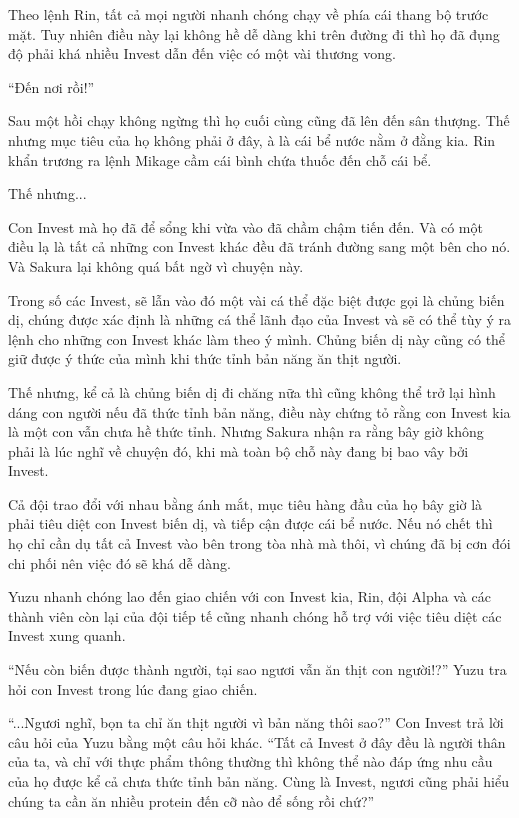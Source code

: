 {Theo lệnh Rin, tất cả mọi người nhanh chóng chạy về phía cái thang bộ
trước mặt. Tuy nhiên điều này lại không hề dễ dàng khi trên đường đi thì
họ đã đụng độ phải khá nhiều Invest dẫn đến việc có một vài thương vong.

``Đến nơi rồi!''

Sau một hồi chạy không ngừng thì họ cuối cùng cũng đã lên đến sân
thượng. Thế nhưng mục tiêu của họ không phải ở đây, à là cái bể nước nằm
ở đằng kia. Rin khẩn trương ra lệnh Mikage cầm cái bình chứa thuốc đến
chỗ cái bể.

Thế nhưng...

Con Invest mà họ đã để sổng khi vừa vào đã chầm chậm tiến đến. Và có một
điều lạ là tất cả những con Invest khác đều đã tránh đường sang một bên
cho nó. Và Sakura lại không quá bất ngờ vì chuyện này.

Trong số các Invest, sẽ lẫn vào đó một vài cá thể đặc biệt được gọi là
chủng biến dị, chúng được xác định là những cá thể lãnh đạo của Invest
và sẽ có thể tùy ý ra lệnh cho những con Invest khác làm theo ý mình.
Chủng biến dị này cũng có thể giữ được ý thức của mình khi thức tỉnh bản
năng ăn thịt người.

Thế nhưng, kể cả là chủng biến dị đi chăng nữa thì cũng không thể trở
lại hình dáng con người nếu đã thức tỉnh bản năng, điều này chứng tỏ
rằng con Invest kia là một con vẫn chưa hề thức tỉnh. Nhưng Sakura nhận
ra rằng bây giờ không phải là lúc nghĩ về chuyện đó, khi mà toàn bộ chỗ
này đang bị bao vây bởi Invest.

Cả đội trao đổi với nhau bằng ánh mắt, mục tiêu hàng đầu của họ bây giờ
là phải tiêu diệt con Invest biến dị, và tiếp cận được cái bể nước. Nếu
nó chết thì họ chỉ cần dụ tất cả Invest vào bên trong tòa nhà mà thôi,
vì chúng đã bị cơn đói chi phối nên việc đó sẽ khá dễ dàng.

Yuzu nhanh chóng lao đến giao chiến với con Invest kia, Rin, đội Alpha
và các thành viên còn lại của đội tiếp tế cũng nhanh chóng hỗ trợ với
việc tiêu diệt các Invest xung quanh.

``Nếu còn biến được thành người, tại sao ngươi vẫn ăn thịt con người!?''
Yuzu tra hỏi con Invest trong lúc đang giao chiến.

``...Ngươi nghĩ, bọn ta chỉ ăn thịt người vì bản năng thôi sao?'' Con
Invest trả lời câu hỏi của Yuzu bằng một câu hỏi khác. ``Tất cả Invest ở
đây đều là người thân của ta, và chỉ với thực phẩm thông thường thì
không thể nào đáp ứng nhu cầu của họ được kể cả chưa thức tỉnh bản năng.
Cùng là Invest, ngươi cũng phải hiểu chúng ta cần ăn nhiều protein đến
cỡ nào để sống rồi chứ?''

}

